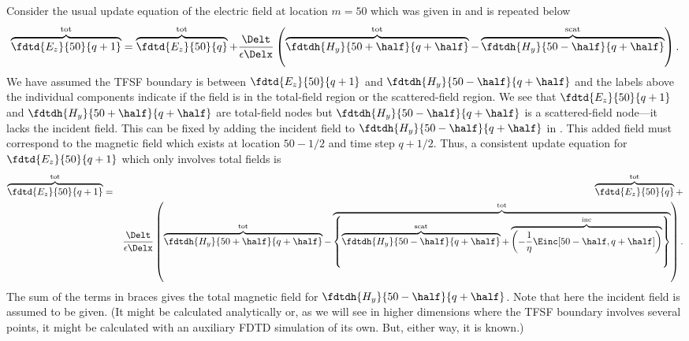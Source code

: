 Consider the usual update equation of the electric field at location
$m=50$ which was given in  and is repeated below
\begin{equation}
  \overbrace{\fdtd{E_z}{50}{q+1}}^{\mbox{\scriptsize tot}}
  =
  \overbrace{\fdtd{E_z}{50}{q}}^{\mbox{\scriptsize tot}} + 
  \frac{\Delt}{\epsilon\Delx}
   \left(
  \overbrace{\fdtdh{H_y}{50+\half}{q+\half}}^{\mbox{\scriptsize tot}} -
  \overbrace{\fdtdh{H_y}{50-\half}{q+\half}}^{\mbox{\scriptsize scat}}
  \right).
  \label{eq:updateEzTFSF}
\end{equation}
We have assumed the TFSF boundary is between $\fdtd{E_z}{50}{q+1}$
and $\fdtdh{H_y}{50-\half}{q+\half}$ and the labels above the individual
components indicate if the field is in the total-field region or the
scattered-field region.  We see that $\fdtd{E_z}{50}{q+1}$ and
$\fdtdh{H_y}{50+\half}{q+\half}$ are total-field nodes but
$\fdtdh{H_y}{50-\half}{q+\half}$ is a scattered-field node---it lacks
the incident field.  This can be fixed by adding the incident field to
$\fdtdh{H_y}{50-\half}{q+\half}$ in
.  This added field must correspond to the
magnetic field which exists at location $50-1/2$ and time step
$q+1/2$.  Thus, a consistent update equation for $\fdtd{E_z}{50}{q+1}$
which only involves total fields is
\begin{eqnarray}
  \overbrace{\fdtd{E_z}{50}{q+1}}^{\mbox{\scriptsize tot}} &=&
  \overbrace{\fdtd{E_z}{50}{q}}^{\mbox{\scriptsize tot}} + {} \\
  &&\frac{\Delt}{\epsilon\Delx}
   \left(
   \overbrace{\fdtdh{H_y}{50+\half}{q+\half}}^{\mbox{\scriptsize tot}} -
   \overbrace{
   \left\{
   \overbrace{\fdtdh{H_y}{50-\half}{q+\half}}^{\mbox{\scriptsize scat}} +
   \overbrace{\left(
     -\frac{1}{\eta}\Einc\!\left[50-\half,q+\half\right]
   \right)}^{\mbox{\scriptsize inc}}
   \right\}}^{\mbox{\scriptsize tot}}\right).
   \nonumber
   \label{eq:updateEzTFSFI}
\end{eqnarray}
The sum of the terms in braces gives the total magnetic field for
$\fdtdh{H_y}{50-\half}{q+\half}$.  Note that here the incident field
is assumed to be given.  (It might be calculated analytically or, as
we will see in higher dimensions where the TFSF boundary involves
several points, it might be calculated with an auxiliary FDTD
simulation of its own.  But, either way, it is known.)

